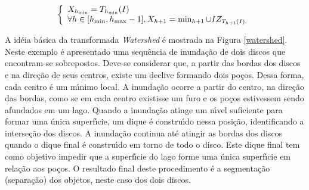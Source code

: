 \begin{equation}
\label{eqWTS}
\left\{ {\begin{array}{*{20}l}
   {X_{h_{\min } }  = T_{h_{\min } } (I)}  \\
   {\forall h \in [h_{\min } ,h_{\max }  - 1],X_{h + 1}  = \min _{h + 1}  \cup IZ_{T_{h + 1} (I).} }  \\
\end{array}} \right.
\end{equation}


A id\'{e}ia b\'{a}sica da transformada \textit{Watershed} \'{e} mostrada na Figura \ref{watershed}. Neste exemplo \'{e} apresentado uma sequ\^{e}ncia de inunda\c{c}\~{a}o de dois discos que encontram-se sobrepostos. Deve-se considerar que, a partir das bordas dos discos e na dire\c{c}\~{a}o de seus centros, existe um declive formando dois po\c{c}os. Dessa forma, cada centro \'{e} um m\'{\i}nimo local. A inunda\c{c}\~{a}o ocorre a partir do centro, na dire\c{c}\~{a}o das bordas, como se em cada centro existisse um furo e os po\c{c}os estivessem sendo afundados em um lago. Quando a inunda\c{c}\~{a}o atinge um n\'{\i}vel suficiente para formar uma \'{u}nica superf\'{\i}cie, um dique \'{e} constru\'{\i}do nessa posi\c{c}\~{a}o, identificando a interse\c{c}\~{a}o dos discos. A inunda\c{c}\~{a}o continua at\'{e} atingir as bordas dos discos quando o dique final \'{e} constru\'{\i}do em torno de todo o disco. Este dique final tem como objetivo impedir que a superf\'{\i}cie do lago forme uma \'{u}nica superf\'{\i}cie em rela\c{c}\~{a}o aos po\c{c}os. O resultado final deste procedimento \'{e} a segmenta\c{c}\~{a}o (separa\c{c}\~{a}o) dos objetos, neste caso dos dois discos.


